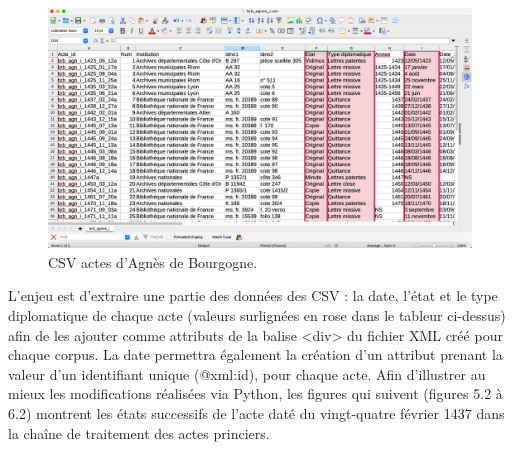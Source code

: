 \begin{figure}[ht]
    \centering
    \includegraphics[scale=0.31]{front/images/csv_ad.png}
    \caption{CSV actes d'Agnès de Bourgogne.}
    \label{fig:csv}
\end{figure}

\par L’enjeu est d’extraire une partie des données des CSV : la date, l'état et le type diplomatique de chaque acte (valeurs surlignées en rose dans le tableur ci-dessus) afin de les ajouter comme attributs de la balise <div> du fichier XML créé pour chaque corpus. La date permettra également la création d'un attribut prenant la valeur d'un identifiant unique (@xml:id), pour chaque acte. Afin d'illustrer au mieux les modifications réalisées via Python, les figures qui suivent (figures 5.2 à 6.2) montrent les états successifs de l'acte daté du vingt-quatre février 1437 dans la chaîne de traitement des actes princiers.
\newpage 

